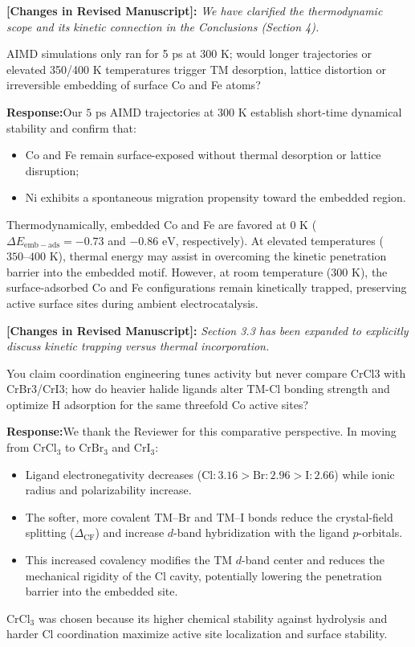 \documentclass[11pt, sans, a4paper]{moderncv}
\newcommand{\response}{\vspace{0.4em}\noindent\textbf{\color{actionblue}Response:}\hspace{0.5em}}
\newcommand{\manuscriptchange}[1]{\vspace{0.3em}\noindent\textbf{\color{acsblue}[Changes in Revised Manuscript]:} \textit{#1}\vspace{0.4em}}
\begin{document}
\manuscriptchange{We have clarified the thermodynamic scope and its kinetic connection in the Conclusions (Section 4).}

\begin{reviewercomment}
AIMD simulations only ran for 5 ps at 300 K; would longer trajectories or elevated 350/400 K temperatures trigger TM desorption, lattice distortion or irreversible embedding of surface Co and Fe atoms?
\end{reviewercomment}

\response Our $5\text{ ps}$ AIMD trajectories at $300\text{ K}$ establish short-time dynamical stability and confirm that:
\begin{itemize}[leftmargin=1.5em, itemsep=0.2em]
    \item Co and Fe remain surface-exposed without thermal desorption or lattice disruption;
    \item Ni exhibits a spontaneous migration propensity toward the embedded region.
\end{itemize}
Thermodynamically, embedded Co and Fe are favored at $0\text{ K}$ ($\Delta E_{\mathrm{emb-ads}} = -0.73$ and $-0.86\text{ eV}$, respectively). At elevated temperatures ($350\text{--}400\text{ K}$), thermal energy may assist in overcoming the kinetic penetration barrier into the embedded motif. However, at room temperature ($300\text{ K}$), the surface-adsorbed Co and Fe configurations remain kinetically trapped, preserving active surface sites during ambient electrocatalysis.

\manuscriptchange{Section 3.3 has been expanded to explicitly discuss kinetic trapping versus thermal incorporation.}

\begin{reviewercomment}
You claim coordination engineering tunes activity but never compare CrCl3 with CrBr3/CrI3; how do heavier halide ligands alter TM-Cl bonding strength and optimize H adsorption for the same threefold Co active sites?
\end{reviewercomment}

\response We thank the Reviewer for this comparative perspective. In moving from $\text{CrCl}_3$ to $\text{CrBr}_3$ and $\text{CrI}_3$:
\begin{itemize}[leftmargin=1.5em, itemsep=0.2em]
    \item Ligand electronegativity decreases ($\text{Cl}: 3.16 > \text{Br}: 2.96 > \text{I}: 2.66$) while ionic radius and polarizability increase.
    \item The softer, more covalent $\text{TM--Br}$ and $\text{TM--I}$ bonds reduce the crystal-field splitting ($\Delta_{\mathrm{CF}}$) and increase $d$-band hybridization with the ligand $p$-orbitals.
    \item This increased covalency modifies the TM $d$-band center and reduces the mechanical rigidity of the Cl cavity, potentially lowering the penetration barrier into the embedded site.
\end{itemize}
$\text{CrCl}_3$ was chosen because its higher chemical stability against hydrolysis and harder Cl coordination maximize active site localization and surface stability.
\end{document}

